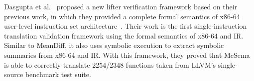 Dasgupta et al.~\cite{dasgupta2020scalable} proposed a new lifter verification 
framework based on their previous work, in which they provided a complete 
formal semantics of x86-64 user-level instruction set architecture~\cite
{dasgupta2019complete}. Their work is the first single-instruction translation 
validation framework using the formal semantics of x86-64 and IR. Similar to 
MeanDiff, it also uses symbolic execution to extract symbolic summaries from 
x86-64 and IR. With this framework, they proved that McSema is able to 
correctly translate 2254/2348 functions taken from LLVM's single-source 
benchmark test suite.
